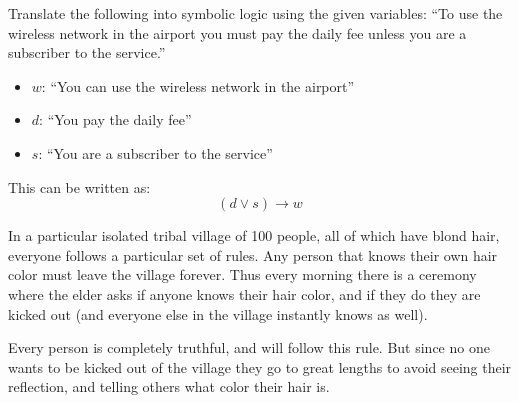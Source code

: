 \documentclass[addpoints]{exam}
\begin{document}
\begin{questions}

  \question[4] Translate the following into symbolic logic using the given
  variables: ``To use the wireless network in the airport you must pay the
  daily fee unless you are a subscriber to the service.''
  \begin{itemize}
    \item $w$: ``You can use the wireless network in the airport''

    \item $d$: ``You pay the daily fee''

    \item $s$: ``You are a subscriber to the service''
  \end{itemize}

  \begin{solution}
    This can be written as:
    \[
      (d\vee s)\rightarrow w
    \]
  \end{solution}

  \question[9] In a particular isolated tribal village of 100 people, all
  of which have blond hair, everyone follows a particular set of rules. Any
  person that knows their own hair color must leave the village forever. Thus
  every morning there is a ceremony where the elder asks if anyone knows their
  hair color, and if they do they are kicked out (and everyone else in the
  village instantly knows as well). 

  Every person is completely truthful, and will follow this rule. But since no
  one wants to be kicked out of the village they go to great lengths to avoid
  seeing their reflection, and telling others what color their hair is.


\end{questions}
\end{document}
